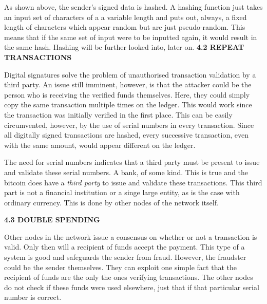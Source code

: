 \documentclass[12pt,a4paper]{report}
\begin{document}
\begin{justify}
As shown above, the sender's signed data is hashed. A hashing function just takes an input set of characters of a a variable length and puts out, always, a fixed length of characters which appear random but are just pseudo-random. This means that if the same set of input were to be inputted again, it would result in the same hash. Hashing will be further looked into, later on.
\newpage
\textbf{4.2 REPEAT TRANSACTIONS}
\vspace{10mm}

Digital signatures solve the problem of unauthorised transaction validation by a third party. An issue still imminent, however, is that the attacker could be the person who is receiving the verified funds themselves. Here, they could simply copy the same transaction multiple times on the ledger. This would work since the transaction was initially verified in the first place. \newline
This can be easily circumvented, however, by the use of serial numbers in every transaction. Since all digitally signed transactions are hashed, every successive transaction, even with the same amount, would appear different on the ledger.\newline

The need for serial numbers indicates that a third party must be present to issue and validate these serial numbers. A bank, of some kind. This is true and the bitcoin does have a \textit{third party} to issue and validate these transactions. This third part is not a financial institution or a singe large entity, as is the case with ordinary currency. This is done by other nodes of the network itself.

\vspace{10mm}
\textbf{4.3 DOUBLE SPENDING}
\vspace{10mm}

Other nodes in the network issue a consensus on whether or not a transaction is valid. Only then will a recipient of funds accept the payment. This type of a system is good and safeguards the sender from fraud. However, the fraudster could be the sender themselves. They can exploit one simple fact that the recipient of funds are the only the ones verifying transactions. The other nodes do not check if these funds were used elsewhere, just that if that particular serial number is correct.\newline


\end{justify}
\end{document}
